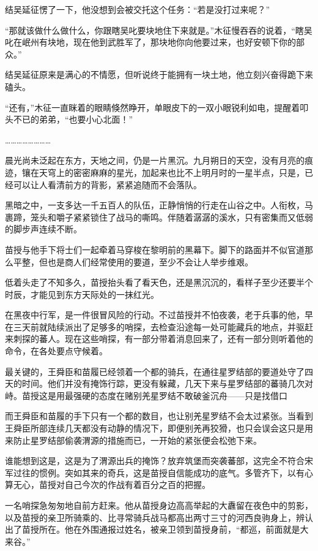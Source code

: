 结吴延征愣了一下，他没想到会被交托这个任务：“若是没打过来呢？”

“那就该做什么做什么，你跟瞎吴叱要块地住下来就是。”木征慢吞吞的说着，“瞎吴叱在岷州有块地，现在他到武胜军了，那块地你向他要过来，也好安顿下你的部众。”

结吴延征原来是满心的不情愿，但听说终于能拥有一块土地，他立刻兴奋得跪下来磕头。

“还有，”木征一直眯着的眼睛倏然睁开，单眼皮下的一双小眼锐利如电，提醒着叩头不已的弟弟，“也要小心北面！”

……………………

晨光尚未泛起在东方，天地之间，仍是一片黑沉。九月朔日的天空，没有月亮的痕迹，镶在天穹上的密密麻麻的星光，加起来也比不上明月时的一星半点，只是，已经可以让人看清前方的背影，紧紧追随而不会落队。

黑暗之中，一支多达一千五百人的队伍，正静悄悄的行走在山谷之中。人衔枚，马裹蹄，笼头和嚼子紧紧锁住了战马的嘶鸣。伴随着潺潺的溪水，只有密集而又低弱的脚步声连续不断。

苗授与他手下将士们一起牵着马穿梭在黎明前的黑幕下。脚下的路面并不似官道那么平整，但也是商人们经常使用的要道，至少不会让人举步维艰。

低着头走了不知多久，苗授抬头看了看天色，还是黑沉沉的，看样子至少还要半个时辰，才能见到东方天际处的一抹红光。

在黑夜中行军，是一件很冒风险的行动。不过苗授并不怕夜袭，老于兵事的他，早在三天前就陆续派出了足够多的哨探，去检查沿途每一处可能藏兵的地点，并驱赶来刺探的蕃人。现在这些哨探，有一部分带着消息回来了，还有一部分则听着他的命令，在各处要点守候着。

最关键的，王舜臣和苗履已经领着一个都的骑兵，在通往星罗结部的要道处守了四天的时间。他们并没有掩饰行踪，更没有躲藏，几天下来与星罗结部的蕃骑几次对峙。苗授这是用最强硬的态度在赌别羌星罗结不敢破釜沉舟——只是找借口

而王舜臣和苗履的手下只有一个都的数目，也让别羌星罗结不会太过紧张。当看到王舜臣所部连续几天都没有动静的情况下，即便别羌再狡猾，也只会误会这只是用来防止星罗结部偷袭渭源的措施而已，一开始的紧张便会松弛下来。

谁能想到这是，这是为了渭源出兵的掩饰？放弃筑堡而突袭蕃部，这完全不符合宋军过往的惯例。突如其来的奇兵，这是苗授自信能成功的底气。多管齐下，以有心算无心，苗授对自己今次的作战有着百分之百的把握。

一名哨探急匆匆地自前方赶来。他从苗授身边高高举起的大纛留在夜色中的剪影，以及苗授的亲卫所骑乘的、比寻常骑兵战马都高出两寸三寸的河西良驹身上，辨认出了苗授所在。他在外围通报过姓名，被亲卫领到苗授身前，“都巡，前面就是大来谷。”

